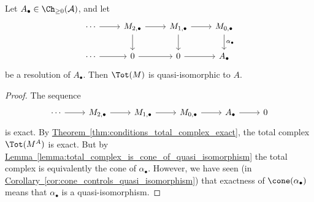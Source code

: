 \documentclass[main.tex]{subfiles}
\begin{document}
\begin{theorem}
  \label{thm:resolutions_in_double_complexes_are_resolutions_of_total_complex}
  Let $A_{\bullet} \in \Ch_{\geq 0}(\mathcal{A})$, and let
  \begin{equation*}
    \begin{tikzcd}
      \cdots
      \arrow[r]
      & M_{2, \bullet}
      \arrow[r]
      \arrow[d]
      & M_{1, \bullet}
      \arrow[r]
      \arrow[d]
      & M_{0, \bullet}
      \arrow[d, "\alpha_{\bullet}"]
      \\
      \cdots
      \arrow[r]
      & 0
      \arrow[r]
      & 0
      \arrow[r]
      & A_{\bullet}
    \end{tikzcd}
  \end{equation*}
  be a resolution of $A_{\bullet}$. Then $\Tot(M)$ is quasi-isomorphic to $A$.
\end{theorem}
\begin{proof}
  The sequence
  \begin{equation*}
    \begin{tikzcd}
      \cdots
      \arrow[r]
      & M_{2,\bullet}
      \arrow[r]
      & M_{1,\bullet}
      \arrow[r]
      & M_{0,\bullet}
      \arrow[r]
      & A_{\bullet}
      \arrow[r]
      & 0
    \end{tikzcd}
  \end{equation*}
  is exact. By \hyperref[thm:conditions_total_complex_exact]{Theorem~\ref*{thm:conditions_total_complex_exact}}, the total complex $\Tot(M^{A})$ is exact. But by \hyperref[lemma:total_complex_is_cone_of_quasi_isomorphism]{Lemma~\ref*{lemma:total_complex_is_cone_of_quasi_isomorphism}} the total complex is equivalently the cone of $\alpha_{\bullet}$. However, we have seen (in \hyperref[cor:cone_controls_quasi_isomorphism]{Corollary~\ref*{cor:cone_controls_quasi_isomorphism}}) that exactness of $\cone(\alpha_{\bullet})$ means that $\alpha_{\bullet}$ is a quasi-isomorphism.
\end{proof}
\end{document}
